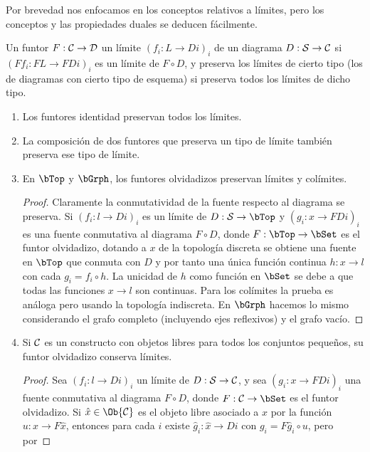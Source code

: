 Por brevedad nos enfocamos en los conceptos relativos a límites, pero los
conceptos y las propiedades duales se deducen fácilmente.

\begin{definition}
  Un funtor $F:\mathcal{C}\to\mathcal{D}$  un límite $(f_i:L\to Di)_i$ de un
  diagrama $D:\mathcal{S}\to\mathcal{C}$ si $(Ff_i:FL\to FDi)_i$ es un límite de $F\circ D$, y
  preserva los límites de cierto tipo (los de diagramas con cierto tipo de
  esquema) si preserva todos los límites de dicho tipo.
\end{definition}

\begin{example}\;
  \begin{enumerate}
  \item Los funtores identidad preservan todos los límites.
  \item La composición de dos funtores que preserva un tipo de límite también
    preserva ese tipo de límite.
  \item En $\bTop$ y $\bGrph$, los funtores olvidadizos preservan límites y
    colímites.
    \begin{proof}
      Claramente la conmutatividad de la fuente respecto al diagrama se
      preserva. Si $(f_i:l\to Di)_i$ es un límite de $D:\cS\to\bTop$ y
      $(g_i:x\to FDi)_i$ es una fuente conmutativa al diagrama $F\circ D$, donde
      $F:\bTop\to\bSet$ es el funtor olvidadizo, dotando a $x$ de la topología
      discreta se obtiene una fuente en $\bTop$ que conmuta con $D$ y por tanto
      una única función continua $h:x\to l$ con cada $g_i=f_i\circ h$. La
      unicidad de $h$ como función en $\bSet$ se debe a que todas las funciones
      $x\to l$ son continuas. Para los colímites la prueba es análoga pero
      usando la topología indiscreta. En $\bGrph$ hacemos lo mismo considerando
      el grafo completo (incluyendo ejes reflexivos) y el grafo vacío.
    \end{proof}
  \item Si $\mathcal{C}$ es un constructo con objetos libres para todos los conjuntos
    pequeños, su funtor olvidadizo conserva límites.
    \begin{proof}
      Sea $(f_i:l\to Di)_i$ un límite de $D:\mathcal{S}\to\mathcal{C}$, y sea $(g_i:x\to FDi)_i$
      una fuente conmutativa al diagrama $F\circ D$, donde $F:\cC\to\bSet$ es el
      funtor olvidadizo. Si $\hat x\in\Ob{\cC}$ es el objeto libre asociado a
      $x$ por la función $u:x\to F\hat x$, entonces para cada $i$
      existe ${\hat g}_i:\hat x\to Di$ con $g_i=F{\hat g}_i\circ u$, pero por

\end{proof}
\end{enumerate}
\end{example}
